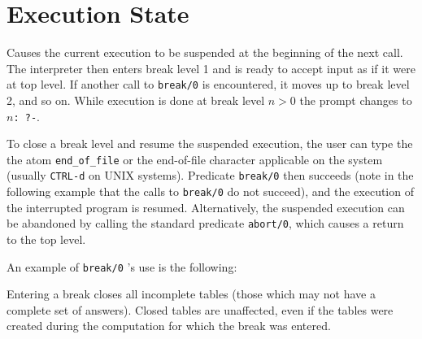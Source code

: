 

\section{Execution State}\label{environmental}

\begin{description}

    Causes the current execution to be suspended at the beginning of the next 
    call.  The interpreter then enters break level 1 and is ready to accept
    input as if it were at top level.  If another call to {\tt break/0} is 
    encountered, it moves up to break level 2, and so on.  While execution 
    is done at break level $n>0$ the prompt changes to {\tt $n$: ?-}.

    To close a break level and resume the suspended execution, the user can 
    type the the atom {\tt end\_of\_file} or the end-of-file character 
    applicable on the system (usually {\tt CTRL-d} on UNIX systems).  
    Predicate {\tt break/0} 
    then succeeds (note in the following example that the calls to {\tt break/0}
    do not succeed), and the execution of the interrupted program is resumed.  
    Alternatively, the suspended execution can be abandoned by calling the 
    standard predicate {\tt abort/0}, which causes a return to the top level.

    An example of {\tt break/0} 's use is the following:


    Entering a break closes all incomplete tables (those which may not have a 
    complete set of answers).  Closed tables are unaffected, even if 
    the tables were created during the computation for which the break was
    entered.


\end{description}
